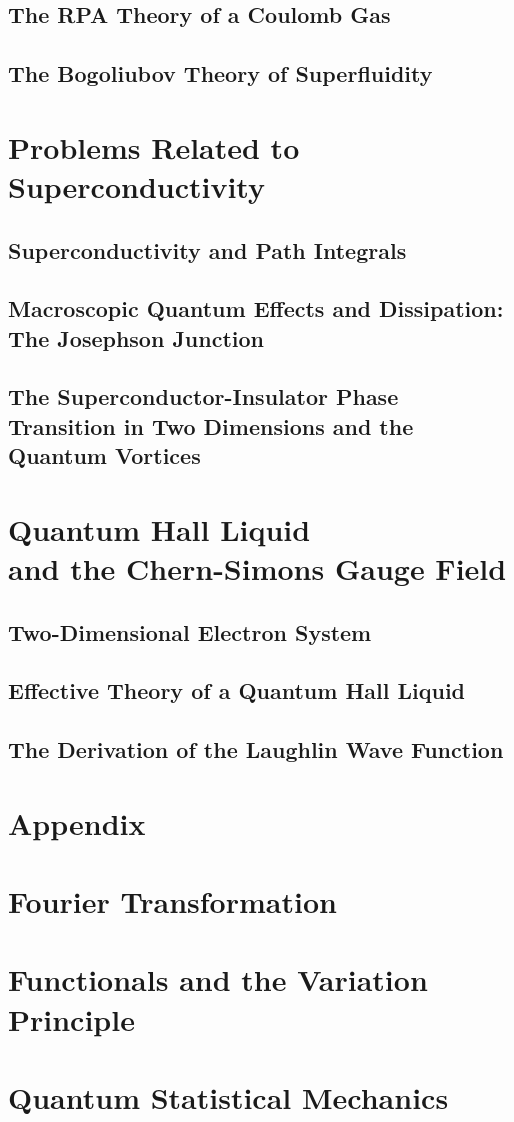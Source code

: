 \documentclass[twoside,11pt]{report}
\begin{document}
\section{The RPA Theory of a Coulomb Gas}
\section{The Bogoliubov Theory of Superfluidity}
\chapter{Problems Related to Superconductivity}\label{chap5}
\section{Superconductivity and Path Integrals}
\section{Macroscopic Quantum Effects and Dissipation: The Josephson Junction}
\section{The Superconductor-Insulator Phase Transition in Two Dimensions and the Quantum Vortices}
\chapter{Quantum Hall Liquid\\ and the Chern-Simons Gauge Field}
\section{Two-Dimensional Electron System}
\section{Effective Theory of a Quantum Hall Liquid}
\section{The Derivation of the Laughlin Wave Function}
\appendix

\chapter*{Appendix}
\chapter{Fourier Transformation}
\chapter{Functionals and the Variation Principle}\label{secapb}
\chapter{Quantum Statistical Mechanics}


\renewcommand{\bibname}{References}


\end{document}
